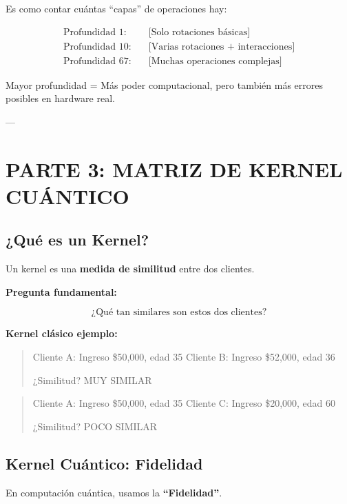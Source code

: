 \documentclass[11pt,a4paper,spanish]{article}
\begin{document}
Es como contar cuántas ``capas'' de operaciones hay:

\begin{align*}
\text{Profundidad 1:} &\quad \text{[Solo rotaciones básicas]}\\
\text{Profundidad 10:} &\quad \text{[Varias rotaciones + interacciones]}\\
\text{Profundidad 67:} &\quad \text{[Muchas operaciones complejas]}
\end{align*}

Mayor profundidad = Más poder computacional, pero también más errores posibles en hardware real.

---

\section{PARTE 3: MATRIZ DE KERNEL CUÁNTICO}

\subsection{¿Qué es un Kernel?}

Un kernel es una \textbf{medida de similitud} entre dos clientes.

\textbf{Pregunta fundamental:}

\[
\text{¿Qué tan similares son estos dos clientes?}
\]

\textbf{Kernel clásico ejemplo:}

\begin{quote}
Cliente A: Ingreso \$50,000, edad 35  
Cliente B: Ingreso \$52,000, edad 36  

¿Similitud? MUY SIMILAR
\end{quote}

\begin{quote}
Cliente A: Ingreso \$50,000, edad 35  
Cliente C: Ingreso \$20,000, edad 60  

¿Similitud? POCO SIMILAR
\end{quote}

\subsection{Kernel Cuántico: Fidelidad}

En computación cuántica, usamos la \textbf{``Fidelidad''}.
\end{document}

